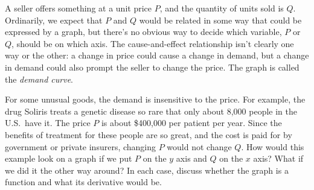 A seller offers something at a unit price $P$, and the quantity of units
sold is $Q$. Ordinarily, we expect that $P$ and $Q$ would be related in some
way that could be expressed by a graph, but there's no obvious way to decide
which variable, $P$ or $Q$, should be on which axis. The cause-and-effect relationship
isn't clearly one way or the other: a change in price could cause a change in demand,
but a change in demand could also prompt the seller to change the price. 
The graph is called the \emph{demand curve}.

For some
unusual goods, the demand is insensitive to the price. For example, the drug
Soliris treats a genetic disease so rare that only about 8,000 people in the U.S.~have it.
The price $P$ is about \$400,000 per patient per year. Since the benefits
of treatment for these people are so great, and the cost is paid for by government
or private insurers, changing $P$ would not change $Q$. How would this example look
on a graph if we put $P$ on the $y$ axis and $Q$ on the $x$ axis? What if we did
it the other way around? In each case, discuss whether the graph is a function and
what its derivative would be.
